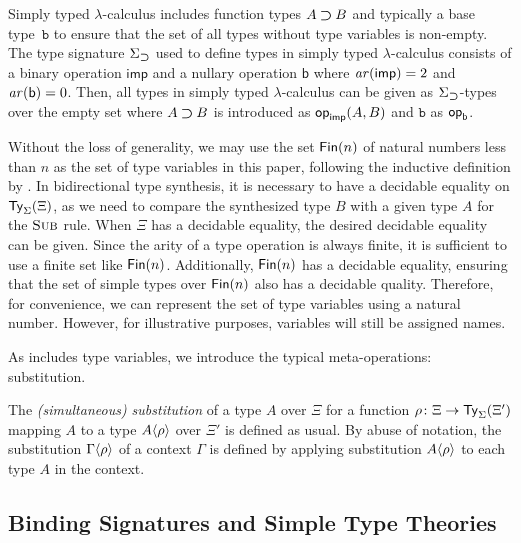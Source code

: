 \begin{example} \label{ex:type-signature-for-function-type}
  Simply typed $\lambda$-calculus includes function types $A \mathbin{\bm{\supset}} B$ and typically a base type~$\mathtt{b}$ to ensure that the set of all types without type variables is non-empty.
  The type signature $\Sigma_{\mathbin{\bm{\supset}}}$ used to define types in simply typed $\lambda$-calculus consists of a binary operation $\mathsf{imp}$ and a nullary operation $\mathsf{b}$ where $\mathit{ar}(\mathsf{imp}) = 2$ and $\mathit{ar}(\mathsf{b}) = 0$.
  Then, all types in simply typed $\lambda$-calculus can be given as $\Sigma_{\mathbin{\bm{\supset}}}$-types over the empty set where $A \mathbin{\bm{\supset}} B$ is introduced as $\mathsf{op}_{\mathsf{imp}}(A, B)$ and $\mathtt{b}$ as $\mathsf{op}_{\mathsf{b}}$. 
\end{example}

Without the loss of generality, we may use the set $\mathsf{Fin}(n)$ of natural numbers less than $n$ as the set of type variables in this paper, following the inductive definition by \citet{Dybjer1994}.
In bidirectional type synthesis, it is necessary to have a decidable equality on $\mathsf{Ty}_{\Sigma}(\Xi)$, as we need to compare the synthesized type $B$ with a given type $A$ for the $\textnormal{\textsc{Sub}}$ rule.
When $\Xi$ has a decidable equality, the desired decidable equality can be given.
Since the arity of a type operation is always finite, it is sufficient to use a finite set like $\mathsf{Fin}(n)$.
Additionally, $\mathsf{Fin}(n)$ has a decidable equality, ensuring that the set of simple types over $\mathsf{Fin}(n)$ also has a decidable quality.
Therefore, for convenience, we can represent the set of type variables using a natural number.
However, for illustrative purposes, variables will still be assigned names.

As  includes type variables, we introduce the typical meta-operations: substitution.
\begin{definition}
  The \emph{(simultaneous) substitution} of a type $A$ over $\Xi$ for a function $\rho\colon\Xi \to \mathsf{Ty}_{\Sigma}(\Xi')$ mapping $A$ to a type ${A}\!\left<{\rho}\right>$ over $\Xi'$ is defined as usual.
  By abuse of notation, the substitution ${\Gamma}\!\left<{\rho}\right>$ of a context $\Gamma$ is defined by applying substitution ${A}\!\left<{\rho}\right>$ to each type $A$ in the context.
\end{definition}

\subsection{Binding Signatures and Simple Type Theories} \label{subsec:binding-sig}

